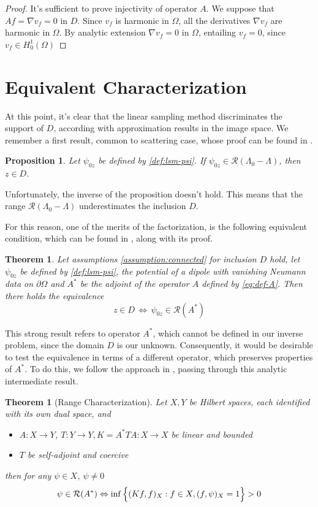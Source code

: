 \documentclass[10pt, a4paper, twoside, openright]{book}
\theoremstyle{definition}
\theoremstyle{plain}
\newtheorem{theorem}[subsection]{Theorem}
\theoremstyle{plain}
\theoremstyle{plain}
\newtheorem{proposition}[subsection]{Proposition}
\theoremstyle{plain}
\theoremstyle{plain}
\theoremstyle{plain}
\theoremstyle{plain}
\theoremstyle{plain}
\begin{document}
\begin{proof}
It's sufficient to prove injectivity of operator $A$. We suppose that $Af=\nabla v_f = 0$ in $D$.
Since $v_f$ is harmonic in $\Omega$, all the derivatives $\nabla v_f$ are harmonic in $\Omega$.
By analytic extension $\nabla v_f = 0$ in $\Omega$, entailing $v_f=0$, since $v_f\in H^1_0(\Omega)$
\end{proof}

\section{Equivalent Characterization}
At this point, it's clear that the linear sampling method discriminates the support of $D$, according with approximation results in the image space. We remember a first result, common to scattering case, whose proof can be found in \cite{somersalo:preprint}.
\begin{proposition}
 Let $\psi_{0z}$ be defined by \ref{def:lsm-psi}. If $\psi_{0z}\in\mathcal{R}(\Lambda_0-\Lambda)$, then $z\in D$.
\end{proposition}
Unfortunately, the inverse of the proposition doesn't hold. This means that the range $\mathcal{R}(\Lambda_0 - \Lambda)$ underestimates the inclusion $D$.
\par
For this reason, one of the merits of the factorization, is the following equivalent condition, which can be found in \cite{kirsch:book}, along with its proof.
\begin{theorem}
\label{theo:equivalence}
 Let assumptions \ref{assumption:connected} for inclusion $D$ hold, let $\psi_{0z}$ be defined by \ref{def:lsm-psi}, the potential of a dipole with vanishing Neumann data on $\partial \Omega$ and $A^*$ be the adjoint of the operator $A$ defined by \ref{eq:def-A}.
 Then there holds the equivalence 
 \begin{equation}
  z \in D \,\Longleftrightarrow \,\psi_{0z} \in \mathcal{R}(A^*)
 \end{equation}
\end{theorem}
This strong result refers to operator $A^*$, which cannot be defined in our inverse problem, since the domain $D$ is our unknown. Consequently, it would be desirable to test the equivalence in terms of a different operator, which preserves properties of $A^*$. To do this, we follow the approach in \cite{kirsch:book}, passing through this analytic intermediate result.
\begin{theorem}[Range Characterization]
\label{theo:range-characterization}
 Let $X,Y$ be Hilbert spaces, each identified with its own dual space, and 
 \begin{itemize}
  \item $A:X\to Y$, $T:Y\to Y, K=A^*TA:X\to X$ be linear and bounded
  \item $T$ be self-adjoint and coercive
 \end{itemize}
 then for any $\psi \in X$, $\psi\neq 0$
 \begin{equation}
 \psi \in \mathcal{R}(A^*) \Leftrightarrow \inf\Big\{(Kf,f)_X   : f\in X, (f,\psi)_X=1\Big\}>0\\
 \end{equation}
\end{theorem}
\end{document}
